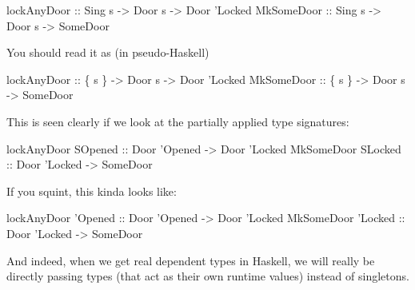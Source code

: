 \documentclass[]{article}
\newenvironment{Shaded}{}{}
\newcommand{\DataTypeTok}[1]{\textcolor[rgb]{0.56,0.13,0.00}{#1}}
\newcommand{\CharTok}[1]{\textcolor[rgb]{0.25,0.44,0.63}{#1}}
\newcommand{\OtherTok}[1]{\textcolor[rgb]{0.00,0.44,0.13}{#1}}
\newcommand{\NormalTok}[1]{#1}
\begin{document}
\begin{Shaded}
\begin{Highlighting}[]
\OtherTok{lockAnyDoor ::} \DataTypeTok{Sing}\NormalTok{ s }\OtherTok{->} \DataTypeTok{Door}\NormalTok{ s }\OtherTok{->} \DataTypeTok{Door} \CharTok{'Locked}
\DataTypeTok{MkSomeDoor}\OtherTok{  ::} \DataTypeTok{Sing}\NormalTok{ s }\OtherTok{->} \DataTypeTok{Door}\NormalTok{ s }\OtherTok{->} \DataTypeTok{SomeDoor}
\end{Highlighting}
\end{Shaded}

You should read it as (in pseudo-Haskell)

\begin{Shaded}
\begin{Highlighting}[]
\OtherTok{lockAnyDoor ::}\NormalTok{ \{ s \} }\OtherTok{->} \DataTypeTok{Door}\NormalTok{ s }\OtherTok{->} \DataTypeTok{Door} \CharTok{'Locked}
\DataTypeTok{MkSomeDoor}\OtherTok{  ::}\NormalTok{ \{ s \} }\OtherTok{->} \DataTypeTok{Door}\NormalTok{ s }\OtherTok{->} \DataTypeTok{SomeDoor}
\end{Highlighting}
\end{Shaded}

This is seen clearly if we look at the partially applied type signatures:

\begin{Shaded}
\begin{Highlighting}[]
\NormalTok{lockAnyDoor }\DataTypeTok{SOpened}\OtherTok{ ::} \DataTypeTok{Door} \CharTok{'Opened -> Door '}\DataTypeTok{Locked}
\DataTypeTok{MkSomeDoor}  \DataTypeTok{SLocked}\OtherTok{ ::} \DataTypeTok{Door} \CharTok{'Locked -> SomeDoor}
\end{Highlighting}
\end{Shaded}

If you squint, this kinda looks like:

\begin{Shaded}
\begin{Highlighting}[]
\NormalTok{lockAnyDoor }\CharTok{'Opened :: Door '}\DataTypeTok{Opened} \OtherTok{->} \DataTypeTok{Door} \CharTok{'Locked}
\DataTypeTok{MkSomeDoor}  \CharTok{'Locked :: Door '}\DataTypeTok{Locked} \OtherTok{->} \DataTypeTok{SomeDoor}
\end{Highlighting}
\end{Shaded}

And indeed, when we get real dependent types in Haskell, we will really be
directly passing types (that act as their own runtime values) instead of
singletons.
\end{document}
